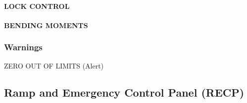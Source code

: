 \paragraph*{LOCK CONTROL}

\paragraph*{BENDING MOMENTS}

\subsubsection{Warnings}
ZERO OUT OF LIMITS (Alert)

\subsection{Ramp and Emergency Control Panel (RECP)}
\label{sec:recp}

